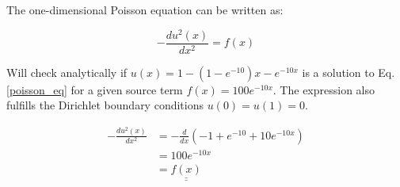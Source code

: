 

The one-dimensional Poisson equation can be written as:

\begin{equation}
   -\frac{du^2(x)}{dx^2} = f(x)
    \label{poisson_eq} 
\end{equation}


Will check analytically if $u(x) = 1 - (1 - e^{-10}) x - e^{-10x} $ is a solution to Eq. \ref{poisson_eq} for a given source term $f(x) = 100e^{-10x}$. The expression also fulfills the Dirichlet boundary conditions $u(0) = u(1) = 0$.


\begin{align}
    -\frac{du^2(x)}{dx^2} &= -\frac{d}{dx}(-1 + e^{-10} + 10e^{-10x}) \\
    &= 100e^{-10x} \\
    &= \underline{\underline{f(x)}}
\end{align}